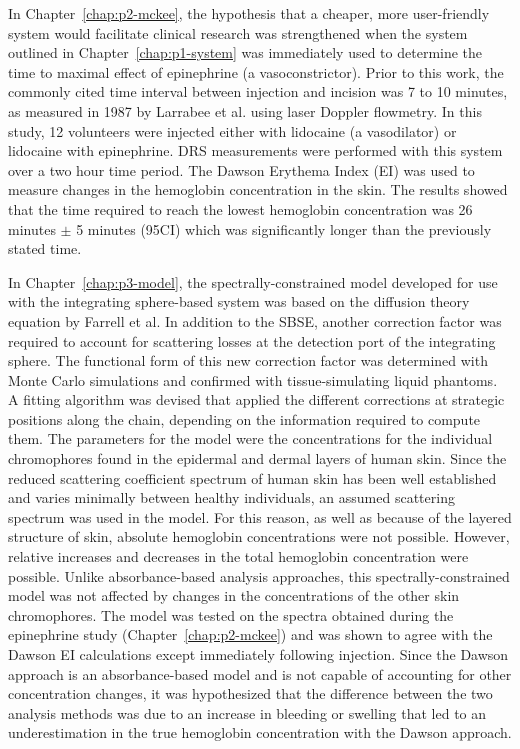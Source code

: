 In Chapter~\ref{chap:p2-mckee}, the hypothesis that a cheaper, more user-friendly system would facilitate clinical research was strengthened when the system outlined in Chapter~\ref{chap:p1-system} was immediately used to determine the time to maximal effect of epinephrine (a vasoconstrictor). Prior to this work, the commonly cited time interval between injection and incision was 7 to 10 minutes, as measured in 1987 by Larrabee et al.\cite{Larrabee1987} using laser Doppler flowmetry. In this study, 12 volunteers were injected either with lidocaine (a vasodilator) or lidocaine with epinephrine. DRS measurements were performed with this system over a two hour time period. The Dawson Erythema Index (EI)\cite{Dawson1980} was used to measure changes in the hemoglobin concentration in the skin. The results showed that the time required to reach the lowest hemoglobin concentration was 26 minutes $\pm$ 5 minutes (95CI) which was significantly longer than the previously stated time.

In Chapter~\ref{chap:p3-model}, the spectrally-constrained model developed for use with the integrating sphere-based system was based on the diffusion theory equation by Farrell et al.\cite{Farrell1992} In addition to the SBSE, another correction factor was required to account for scattering losses at the detection port of the integrating sphere. The functional form of this new correction factor was determined with Monte Carlo simulations and confirmed with tissue-simulating liquid phantoms. A fitting algorithm was devised that applied the different corrections at strategic positions along the chain, depending on the information required to compute them. The parameters for the model were the concentrations for the individual chromophores found in the epidermal and dermal layers of human skin. Since the reduced scattering coefficient spectrum of human skin has been well established and varies minimally between healthy individuals, an assumed scattering spectrum was used in the model. For this reason, as well as because of the layered structure of skin, absolute hemoglobin concentrations were not possible. However, relative increases and decreases in the total hemoglobin concentration were possible. Unlike absorbance-based analysis approaches, this spectrally-constrained model was not affected by changes in the concentrations of the other skin chromophores. The model was tested on the spectra obtained during the epinephrine study (Chapter~\ref{chap:p2-mckee}) and was shown to agree with the Dawson EI calculations except immediately following injection. Since the Dawson approach is an absorbance-based model and is not capable of accounting for other concentration changes, it was hypothesized that the difference between the two analysis methods was due to an increase in bleeding or swelling that led to an underestimation in the true hemoglobin concentration with the Dawson approach. 

